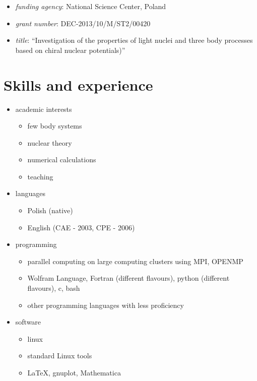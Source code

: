 \begin{itemize}
\begin{itemize}
    \begin{itemize}
    \tightlist
    \item
      \emph{funding agency}: National Science Center, Poland
    \item
      \emph{grant number}: DEC-2013/10/M/ST2/00420
    \item
      \emph{title}: ``Investigation of the properties of light nuclei
      and three body processes based on chiral nuclear potentials)''
    \end{itemize}
  \end{itemize}
\end{itemize}

\hypertarget{skills-and-experience}{%
\section{Skills and experience}\label{skills-and-experience}}

\begin{itemize}
\tightlist
\item
  academic interests

  \begin{itemize}
  \tightlist
  \item
    few body systems
  \item
    nuclear theory
  \item
    numerical calculations
  \item
    teaching
  \end{itemize}
\item
  languages

  \begin{itemize}
  \tightlist
  \item
    Polish (native)
  \item
    English (CAE - 2003, CPE - 2006)
  \end{itemize}
\item
  programming

  \begin{itemize}
  \tightlist
  \item
    parallel computing on large computing clusters using MPI, OPENMP
  \item
    Wolfram Language, Fortran (different flavours), python (different
    flavours), c, bash
  \item
    other programming languages with less proficiency
  \end{itemize}
\item
  software

  \begin{itemize}
  \tightlist
  \item
    linux
  \item
    standard Linux tools
  \item
    LaTeX, gnuplot, Mathematica
  \end{itemize}
\end{itemize}

